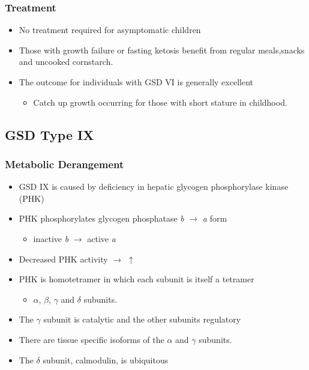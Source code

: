 \documentclass{scrartcl}
\begin{document}
\subsubsection{Treatment}
\label{sec:org3c94fc1}
\begin{itemize}
\item No treatment required for asymptomatic children
\item Those with growth failure or fasting ketosis benefit from regular
meals,snacks and uncooked cornstarch.
\item The outcome for individuals with GSD VI is generally excellent
\begin{itemize}
\item Catch up growth occurring for those with short stature in childhood.
\end{itemize}
\end{itemize}
\subsection{GSD Type IX}
\label{sec:orge267dd2}
\subsubsection{Metabolic Derangement}
\label{sec:orgaf083ae}
\begin{itemize}
\item GSD IX is caused by deficiency in hepatic glycogen phosphorylase kinase (PHK)
\item PHK phosphorylates glycogen phosphatase \emph{b} \(\to\) \emph{a} form
\begin{itemize}
\item inactive \emph{b} \(\to\)  active \emph{a}
\end{itemize}
\item Decreased PHK activity \(\to\) \(\uparrow\)
\item PHK is homotetramer in which each subunit is itself a tetramer
\begin{itemize}
\item \(\alpha\), \(\beta\), \(\gamma\) and \(\delta\) subunits.
\end{itemize}
\item The \(\gamma\) subunit is catalytic and the other subunits regulatory
\item There are tissue specific isoforms of the \(\alpha\) and \(\gamma\) subunits.
\item The \(\delta\) subunit, calmodulin, is ubiquitous
\end{itemize}
\end{document}
